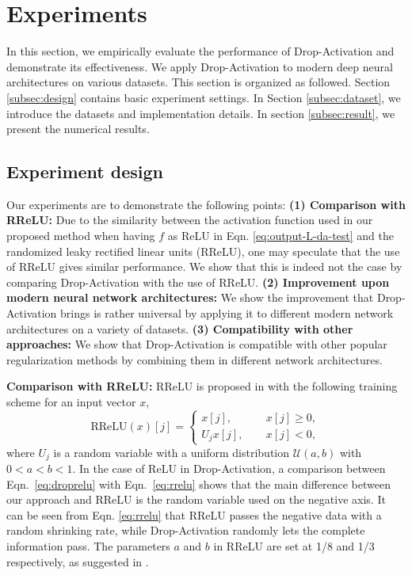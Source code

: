 \documentclass[11pt]{article}
\begin{document}
\section{Experiments}
\label{sec:4}
In this section, we empirically evaluate the performance of Drop-Activation and demonstrate its effectiveness. We apply Drop-Activation to modern deep neural architectures on various datasets. This section is organized as followed. Section \ref{subsec:design} contains basic experiment settings. In Section \ref{subsec:dataset}, we introduce the datasets and implementation details. In section \ref{subsec:result}, we present the numerical results.

\subsection{Experiment design}
\label{sec:exp design}
Our experiments are to demonstrate the following points:
\textbf{(1) Comparison with RReLU:} Due to the similarity between the activation function used in our proposed method when having $f$ as ReLU in Eqn. \eqref{eq:output-L-da-test} and the randomized leaky rectified linear units (RReLU), one may speculate that the use of RReLU gives similar performance. We show that this is indeed not the case by comparing Drop-Activation with the use of RReLU.
\textbf{(2) Improvement upon modern neural network architectures:} We show the improvement that Drop-Activation brings is rather universal by applying it to different modern network architectures on a variety of datasets.
\textbf{(3) Compatibility with other approaches:} We show that Drop-Activation is compatible with other popular regularization methods by combining them in different network architectures.



\label{subsec:design}
\textbf{Comparison with RReLU:} RReLU is proposed in \cite{rrelu} with the following training scheme for an input vector $x$,
\begin{equation}
\text{RReLU}(x)[j] = \left\{
\begin{aligned}
x[j] ,&\quad\ x[j]\geq 0,\\
U_jx[j],&\quad\ x[j]<0,
\end{aligned}
\right.
\label{eq:rrelu}
\end{equation}
where $U_j$ is a random variable with a uniform distribution $\mathcal{U}(a, b)$ with $0<a<b<1$. In the case of ReLU in Drop-Activation, a comparison between Eqn.~\eqref{eq:droprelu} with Eqn.~\eqref{eq:rrelu} shows that the main difference between our approach and RReLU is the random variable used on the negative axis. It can be seen from Eqn. \eqref{eq:rrelu} that RReLU passes the negative data with a random shrinking rate, while Drop-Activation randomly lets the complete information pass. The parameters $a$ and $b$ in RReLU are set at 1/8 and 1/3 respectively, as suggested in \cite{rrelu}.
\end{document}
